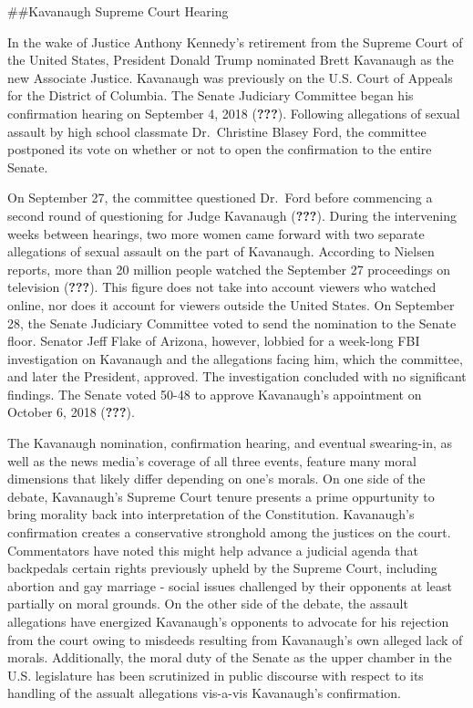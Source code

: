 \documentclass[,man]{apa6}
\theoremstyle{definition}
\theoremstyle{definition}
\theoremstyle{definition}
\theoremstyle{remark}
\begin{document}
\#\#Kavanaugh Supreme Court Hearing

In the wake of Justice Anthony Kennedy's retirement from the Supreme
Court of the United States, President Donald Trump nominated Brett
Kavanaugh as the new Associate Justice. Kavanaugh was previously on the
U.S. Court of Appeals for the District of Columbia. The Senate Judiciary
Committee began his confirmation hearing on September 4, 2018
({\textbf{???}}). Following allegations of sexual assault by high school
classmate Dr.~Christine Blasey Ford, the committee postponed its vote on
whether or not to open the confirmation to the entire Senate.

On September 27, the committee questioned Dr.~Ford before commencing a
second round of questioning for Judge Kavanaugh ({\textbf{???}}). During
the intervening weeks between hearings, two more women came forward with
two separate allegations of sexual assault on the part of Kavanaugh.
According to Nielsen reports, more than 20 million people watched the
September 27 proceedings on television ({\textbf{???}}). This figure
does not take into account viewers who watched online, nor does it
account for viewers outside the United States. On September 28, the
Senate Judiciary Committee voted to send the nomination to the Senate
floor. Senator Jeff Flake of Arizona, however, lobbied for a week-long
FBI investigation on Kavanaugh and the allegations facing him, which the
committee, and later the President, approved. The investigation
concluded with no significant findings. The Senate voted 50-48 to
approve Kavanaugh's appointment on October 6, 2018 ({\textbf{???}}).

The Kavanaugh nomination, confirmation hearing, and eventual
swearing-in, as well as the news media's coverage of all three events,
feature many moral dimensions that likely differ depending on one's
morals. On one side of the debate, Kavanaugh's Supreme Court tenure
presents a prime oppurtunity to bring morality back into interpretation
of the Constitution. Kavanaugh's confirmation creates a conservative
stronghold among the justices on the court. Commentators have noted this
might help advance a judicial agenda that backpedals certain rights
previously upheld by the Supreme Court, including abortion and gay
marriage - social issues challenged by their opponents at least
partially on moral grounds. On the other side of the debate, the assault
allegations have energized Kavanaugh's opponents to advocate for his
rejection from the court owing to misdeeds resulting from Kavanaugh's
own alleged lack of morals. Additionally, the moral duty of the Senate
as the upper chamber in the U.S. legislature has been scrutinized in
public discourse with respect to its handling of the assualt allegations
vis-a-vis Kavanaugh's confirmation.
\end{document}
